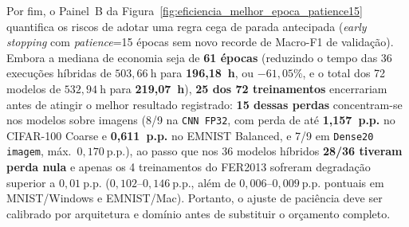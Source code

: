 \documentclass[
    12pt,
    openright,
    oneside,
    a4paper,
    english,
    brazil
]{abntex2}
\begin{document}
Por fim, o Painel~B da Figura~\ref{fig:eficiencia_melhor_epoca_patience15} quantifica os riscos de adotar uma regra cega de parada antecipada (\textit{early stopping} com \textit{patience}=15 épocas sem novo recorde de Macro-F1 de validação). Embora a mediana de economia seja de \textbf{61 épocas} (reduzindo o tempo das 36 execuções híbridas de \(503{,}66~\text{h}\) para \textbf{196,18~h}, ou \(-61{,}05\%\), e o total dos 72 modelos de \(532{,}94~\text{h}\) para \textbf{219,07~h}), \textbf{25 dos 72 treinamentos} encerrariam antes de atingir o melhor resultado registrado: \textbf{15 dessas perdas} concentram-se nos modelos sobre imagens (8/9 na \texttt{CNN FP32}, com perda de até \textbf{1,157~p.p.} no CIFAR-100 Coarse e \textbf{0,611~p.p.} no EMNIST Balanced, e 7/9 em \texttt{Dense20 imagem}, máx.\ \(0{,}170~\text{p.p.}\)), ao passo que nos 36 modelos híbridos \textbf{28/36 tiveram perda nula} e apenas os 4 treinamentos do FER2013 sofreram degradação superior a \(0{,}01~\text{p.p.}\) (\(0{,}102\text{--}0{,}146~\text{p.p.}\), além de \(0{,}006\text{--}0{,}009~\text{p.p.}\) pontuais em MNIST/Windows e EMNIST/Mac). Portanto, o ajuste de paciência deve ser calibrado por arquitetura e domínio antes de substituir o orçamento completo.
\end{document}
